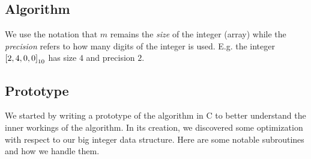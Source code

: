 

\subsection{Algorithm}
We use the notation that $m$
remains the \textit{size} of the integer (array) while the \textit{precision}
refers to how many digits of the integer is used. E.g. the integer
$\mathtt{[}2, 4, 0, 0\mathtt{]}_{10}$ has size $4$ and precision $2$.

\subsection{Prototype}
We started by writing a prototype of the algorithm in C to better understand the
inner workings of the algorithm. In its creation, we discovered some
optimization with respect to our big integer data structure. Here are some
notable subroutines and how we handle them.

